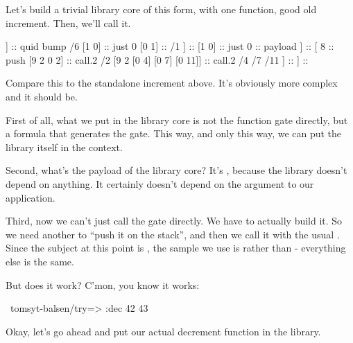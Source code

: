 Let's build a trivial library core of this form, with one
function, good old increment.  Then, we'll call it.

\begin{code}
[ 8                                          ::  push
  [                                          ::  cons
    [ 1                                      ::  quid          ::  battery
      [1 [4 0 6]]                            ::  quid bump /6
      [1 0]                                  ::  just 0
      [0 1]                                  ::  /1
    ]                                        ::
    [1 0]                                    ::  just 0        ::  payload
  ]                                          ::  
  [ 8                                        ::  push
    [9 2 0 2]                                ::  call.2 /2
    [9 2 [0 4] [0 7] [0 11]]                 ::  call.2 /4 /7 /11
  ]                                          ::
]                                            ::
\end{code}
Compare this to the standalone increment above.  It's obviously
more complex and it should be.

First of all, what we put in the library core is not the function
gate directly, but a formula that generates the gate.  This way,
and only this way, we can put the library itself in the context.

Second, what's the payload of the library core?  It's ,
because the library doesn't depend on anything.  It certainly
doesn't depend on the argument to our application.

Third, now we can't just call the gate directly.  We have to
actually build it.  So we need another  to ``push it on the
stack'', and then we call it with the usual .  Since the
subject at this point is , the sample we
use is \kode{[0 7]} rather than \kode{[0 3]} - everything else is the same.

But does it work?  C'mon, you know it works:

\begin{code}
~tomsyt-balsen/try=> :dec 42
43
\end{code}
Okay, let's go ahead and put our actual decrement function in
the library.

